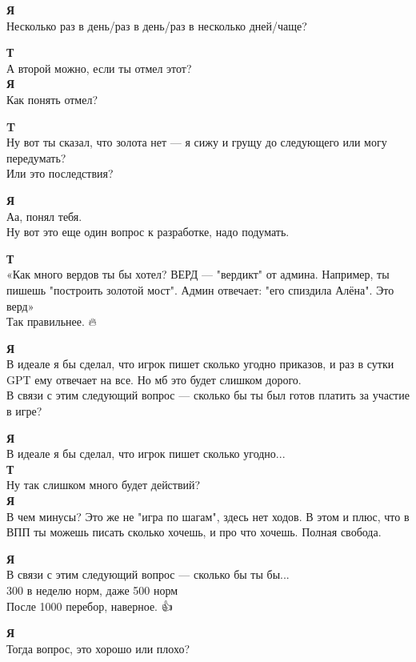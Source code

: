 \textbf{Я} \\
Несколько раз в день/раз в день/раз в несколько дней/чаще?

\textbf{Т} \\
А второй можно, если ты отмел этот? \\

\textbf{Я} \\
Как понять отмел?

\textbf{T} \\
Ну вот ты сказал, что золота нет — я сижу и грущу до следующего или могу передумать? \\
Или это последствия?

\textbf{Я} \\
Аа, понял тебя. \\
Ну вот это еще один вопрос к разработке, надо подумать.

\textbf{Т} \\
«Как много вердов ты бы хотел? ВЕРД — "вердикт" от админа. Например, ты пишешь "построить золотой мост". Админ отвечает: "его спиздила Алёна". Это верд» \\
Так правильнее. 🔥🦔

\textbf{Я} \\
В идеале я бы сделал, что игрок пишет сколько угодно приказов, и раз в сутки GPT ему отвечает на все. Но мб это будет слишком дорого. \\
В связи с этим следующий вопрос — сколько бы ты был готов платить за участие в игре?

\textbf{Я} \\
В идеале я бы сделал, что игрок пишет сколько угодно... \\

\textbf{Т} \\
Ну так слишком много будет действий?\\

\textbf{Я} \\
В чем минусы? Это же не "игра по шагам", здесь нет ходов. В этом и плюс, что в ВПП ты можешь писать сколько хочешь, и про что хочешь. Полная свобода.

\textbf{Я} \\
В связи с этим следующий вопрос — сколько бы ты бы... \\
300 в неделю норм, даже 500 норм \\
После 1000 перебор, наверное. 👍🎅

\textbf{Я} \\
Тогда вопрос, это хорошо или плохо?

